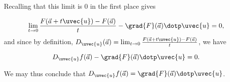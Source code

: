 \documentclass{ximera}
\begin{document}
Recalling that this limit is 0 in the first place gives

\[
\lim_{t \to 0} \frac{F( \vec{a}+t\uvec{u})-F(\vec{a})}{t} - \grad{F}(\vec{a}) \dotp \uvec{u} = 0,
\]
and since by definition, $D_{\uvec{u}}(\vec{a}) = \lim_{t \to 0} \frac{F( \vec{a}+t\uvec{u})-F(\vec{a})}{t}$, we have

\[
D_{\uvec{u}} f(\vec{a}) - \grad{F}(\vec{a}) \dotp \uvec{u} = 0.
\]

We may thus conclude that $D_{\uvec{u}} f(\vec{a}) = \grad{F}(\vec{a}) \dotp \uvec{u}$.
\end{document}
